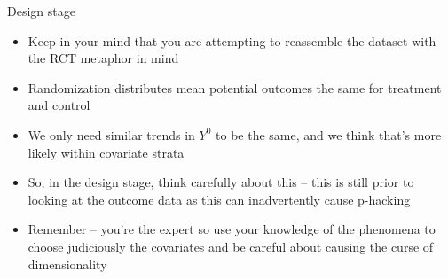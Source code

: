 \documentclass{beamer}
\begin{document}
\begin{frame}{Design stage}

\begin{itemize}

\item Keep in your mind that you are attempting to reassemble the dataset with the RCT metaphor in mind
\item Randomization distributes mean potential outcomes the same for treatment and control
\item We only need similar trends in $Y^0$ to be the same, and we think that's more likely within covariate strata
\item So, in the design stage, think carefully about this -- this is still prior to looking at the outcome data as this can inadvertently cause p-hacking
\item Remember -- you're the expert so use your knowledge of the phenomena to choose judiciously the covariates and be careful about causing the curse of dimensionality

\end{itemize}

\end{frame}
\end{document}
